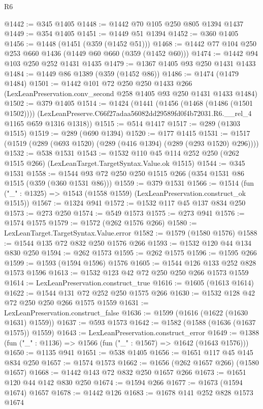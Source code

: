 \begin{lexlean}{R6}
\begin{coremodule}
@1442 := @345 @1405
@1448 := @1442 @70 @105 @250 @805 @1394 @1437
@1449 := @354 @1405
@1451 := @1449 @51 @1394
@1452 := @360 @1405
@1456 := @1448 (@1451 (@359 (@1452 @51)))
@1468 := @1442 @77 @104 @250 @253 @660 @1436 (@1449 @60 @660 (@359 (@1452 @60)))
@1474 := @1442 @94 @103 @250 @252 @1431 @1435
@1479 := @1367 @1405 @93 @250 @1431 @1433
@1484 := @1449 @86 @1389 (@359 (@1452 @86))
@1486 := @1474 (@1479 @1484)
@1501 := @1442
    @101
    @72
    @250
    @250
    @1433
    @266
    (LexLeanPreservation.conv_second @258 @1405 @93 @250 @1431 @1433 @1484)
@1502 := @379 @1405
@1514 := @1424
    (@1441
      (@1456 (@1468 (@1486 (@1501 @1502))))
      (LexLeanPreserve.C66f27adaa56082dd29589fd0f4b72031.R6.__rel_4 @1165 @659 @1316 @1318))
@1515 := @514 @1417
@1517 := @289 (@1303 @1515)
@1519 := @289 (@690 @1394)
@1520 := @177 @1415
@1531 := @1517 (@1519 (@289 (@693 @1520) (@289 (@416 @1394) (@289 (@293 @1520) @296))))
@1532 := @538 @1531
@1543 := @1532 @110 @45 @114 @252 @250 (@262 @1515 @266) (LexLeanTarget.TargetSyntax.Value.ok @1515)
@1544 := @345 @1531
@1558 := @1544 @93 @72 @250 @250 @1515 @266 (@354 @1531 @86 @1515 (@359 (@360 @1531 @86)))
@1559 := @379 @1531
@1566 := @1514 (fun ("_" : @1325) => @1543 (@1558 @1559) (LexLeanPreservation.construct_ok @1515))
@1567 := @1324 @941
@1572 := @1532 @117 @45 @137 @834 @250
@1573 := @273 @250
@1574 := @549 @1573
@1575 := @273 @941
@1576 := @1574 @1575
@1579 := @1572 (@262 @1576 @266)
@1580 := LexLeanTarget.TargetSyntax.Value.error
@1582 := @1579 (@1580 @1576)
@1588 := @1544 @135 @72 @832 @250 @1576 @266
@1593 := @1532 @120 @44 @134 @830 @250
@1594 := @262 @1573
@1595 := @262 @1575
@1596 := @1595 @266
@1599 := @1593 (@1594 @1596) @1576
@1605 := @1544 @126 @133 @252 @828 @1573 @1596
@1613 := @1532 @123 @42 @72 @250 @250 @266 @1573 @1559
@1614 := LexLeanPreservation.construct_true
@1616 := @1605 (@1613 @1614)
@1622 := @1544 @131 @72 @252 @250 @1575 @266
@1630 := @1532 @128 @42 @72 @250 @250 @266 @1575 @1559
@1631 := LexLeanPreservation.construct_false
@1636 := @1599 (@1616 (@1622 (@1630 @1631) @1559))
@1637 := @593 @1573
@1642 := @1582 (@1588 (@1636 (@1637 @1575)) @1559)
@1643 := LexLeanPreservation.construct_error
@1649 := @1388 (fun ("_" : @1136) => @1566 (fun ("_" : @1567) => @1642 (@1643 @1576)))
@1650 := @1135 @941
@1651 := @538 @1405
@1656 := @1651 @117 @45 @145 @834 @250
@1657 := @1574 @1573
@1662 := @1656 (@262 @1657 @266) (@1580 @1657)
@1668 := @1442 @143 @72 @832 @250 @1657 @266
@1673 := @1651 @120 @44 @142 @830 @250
@1674 := @1594 @266
@1677 := @1673 (@1594 @1674) @1657
@1678 := @1442 @126
@1683 := @1678 @141 @252 @828 @1573 @1674

\end{coremodule}
\end{lexlean}
